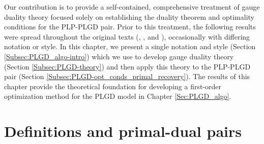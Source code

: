 Our contribution is to provide a self-contained, comprehensive treatment of gauge duality theory focused solely on establishing the duality theorem and optimality conditions for the PLP-PLGD pair.  Prior to this treatment, the following results were spread throughout the original texts (\cite{rockafellar1970convex}, \cite{DBLP:journals/siamjo/FriedlanderMP14}, and \cite{DBLP:journals/siamsc/FriedlanderM16}), occasionally with differing notation or style.  In this chapter, we present a single notation and style (Section \ref{Subsec:PLGD_algo-intro}) which we use to develop gauge duality theory (Section \ref{Subsec:PLGD-theory}) and then apply this theory to the PLP-PLGD pair (Section \ref{Subsec:PLGD-opt_conds_primal_recovery}).  The results of this chapter provide the theoretical foundation for developing a first-order optimization method for the PLGD model in Chapter \ref{Sec:PLGD_algo}.


\section{Definitions and primal-dual pairs}		\label{Subsec:PLGD-models_intro}

